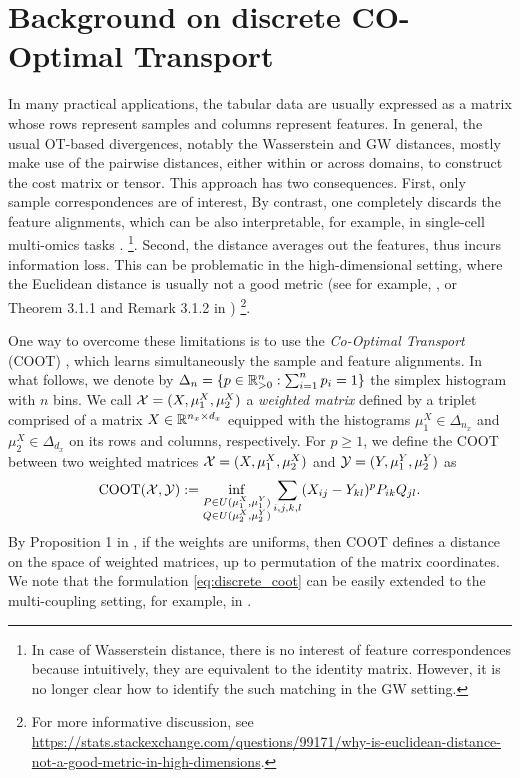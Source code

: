 \raggedbottom

\section{Background on discrete CO-Optimal Transport}

In many practical applications, the tabular data are usually expressed as a matrix whose rows
represent samples and columns represent features.
In general, the usual OT-based divergences, notably the Wasserstein and GW distances, mostly make
use of the pairwise distances, either within or across domains, to construct the cost matrix
or tensor. This approach has two consequences. First, only sample correspondences are of interest,
By contrast, one completely discards the feature alignments, which can be also interpretable,
for example, in single-cell multi-omics tasks \citep{Demetci20b}.
\footnote{In case of Wasserstein distance, there is no interest of feature correspondences
because intuitively, they are equivalent to the identity matrix. However,
it is no longer clear how to identify the such matching in the GW setting.}.
Second, the distance averages out the features, thus incurs information loss.
This can be problematic in the high-dimensional setting,
where the Euclidean distance is usually not a good metric
(see for example, \citep{Aggarwal01}, or Theorem 3.1.1 and Remark 3.1.2 in \citep{Vershynin18})
\footnote{For more informative discussion,
see \url{https://stats.stackexchange.com/questions/99171/why-is-euclidean-distance-not-a-good-metric-in-high-dimensions}.}.

One way to overcome these limitations is to use the \textit{Co-Optimal Transport} (COOT)
\citep{Redko20}, which learns simultaneously the sample and feature alignments.
In what follows, we denote by $\Delta_{n}= \{p \in \mathbb R_{> 0}^n: \sum_{i=1}^{n} p_{i}=1\}$
the simplex histogram with $n$ bins. We call $\mathcal X = (X, \mu_1^X, \mu_2^X)$ a \textit{weighted matrix}
defined by a triplet comprised of a matrix $X \in \mathbb R^{n_x \times d_x}$
equipped with the histograms $\mu_1^X \in \Delta_{n_x}$ and $\mu_2^X \in \Delta_{d_x}$
on its rows and columns, respectively. For $p \geq 1$, we define the COOT between two
weighted matrices $\mathcal X = (X, \mu_1^X, \mu_2^X)$ and $\mathcal Y = (Y, \mu_1^Y, \mu_2^Y)$ as
\begin{align}
  \label{eq:discrete_coot}
    \text{COOT}(\mathcal X, \mathcal Y) :=
    \inf_{\substack{P \in U(\mu_1^X, \mu_1^Y) \\ Q \in U(\mu_2^X, \mu_2^Y)}}
    \sum_{i,j,k,l} (X_{ij} - Y_{kl})^p P_{ik} Q_{jl}.
\end{align}
By Proposition 1 in \citep{Redko20}, if the weights are uniforms,
then COOT defines a distance on the space of weighted matrices,
up to permutation of the matrix coordinates. We note that the formulation \eqref{eq:discrete_coot}
can be easily extended to the multi-coupling setting, for example, in \citep{Kerdoncuff22}.

